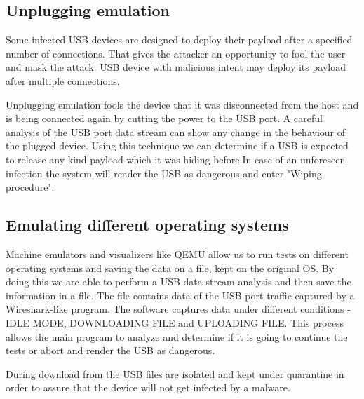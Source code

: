 \documentclass[sigconf]{acmart}
\begin{document}
\subsection{Unplugging emulation}
\par \quad Some infected USB devices are designed to deploy their payload after a specified number of connections. That gives the attacker an opportunity to fool the user and mask the attack. USB device with malicious intent may deploy its payload after multiple connections.
\par Unplugging emulation fools the device that it was disconnected from the host and is being connected again by cutting the power to the USB port. A careful analysis of the USB port data stream can show any change in the behaviour of the plugged device. Using this technique we can determine if a USB is expected to release any kind payload which it was hiding before.In case of an unforeseen infection the system will render the USB as dangerous and enter "Wiping procedure".

\subsection{Emulating different operating systems}
\par \quad Machine emulators and visualizers like QEMU \cite{qemu} allow us to run tests on different operating systems and saving the data on a file, kept on the original OS. By doing this we are able to perform a USB data stream analysis and then save the information in a file. The file contains data of the USB port traffic captured by a Wireshark-like program. The software captures data under different conditions - IDLE MODE, DOWNLOADING FILE and UPLOADING FILE. This process allows the main program to analyze and determine if it is going to continue the tests or abort and render the USB as dangerous.
\par During download from the USB files are isolated and kept under quarantine in order to assure that the device will not get infected by a malware. 
\end{document}
